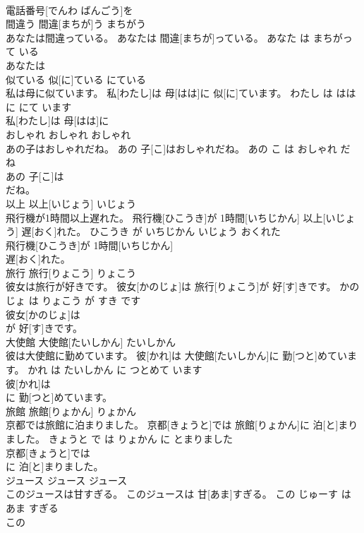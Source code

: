 \documentclass[8pt]{extreport}
\begin{document}
\begin{CJK}{UTF8}{min}
\\	電話番号[でんわ ばんごう]を
\\	間違う	間違[まちが]う	まちがう	
\\	あなたは間違っている。	あなたは 間違[まちが]っている。	あなた は まちがって いる	
\\	あなたは
\\	似ている	似[に]ている	にている	
\\	私は母に似ています。	私[わたし]は 母[はは]に 似[に]ています。	わたし は はは に にて います	
\\	私[わたし]は 母[はは]に
\\	おしゃれ	おしゃれ	おしゃれ	
\\	あの子はおしゃれだね。	あの 子[こ]はおしゃれだね。	あの こ は おしゃれ だ ね	
\\	あの 子[こ]は
\\	だね。		
\\	以上	以上[いじょう]	いじょう	
\\	飛行機が1時間以上遅れた。	飛行機[ひこうき]が 1時間[いちじかん] 以上[いじょう] 遅[おく]れた。	ひこうき が いちじかん いじょう おくれた	
\\	飛行機[ひこうき]が 1時間[いちじかん]
\\	遅[おく]れた。		
\\	旅行	旅行[りょこう]	りょこう	
\\	彼女は旅行が好きです。	彼女[かのじょ]は 旅行[りょこう]が 好[す]きです。	かのじょ は りょこう が すき です	
\\	彼女[かのじょ]は
\\	が 好[す]きです。		
\\	大使館	大使館[たいしかん]	たいしかん	
\\	彼は大使館に勤めています。	彼[かれ]は 大使館[たいしかん]に 勤[つと]めています。	かれ は たいしかん に つとめて います	
\\	彼[かれ]は
\\	に 勤[つと]めています。		
\\	旅館	旅館[りょかん]	りょかん	
\\	京都では旅館に泊まりました。	京都[きょうと]では 旅館[りょかん]に 泊[と]まりました。	きょうと で は りょかん に とまりました	
\\	京都[きょうと]では
\\	に 泊[と]まりました。		
\\	ジュース	ジュース	ジュース	
\\	このジュースは甘すぎる。	このジュースは 甘[あま]すぎる。	この じゅーす は あま すぎる	
\\	この

\end{CJK}
\end{document}
